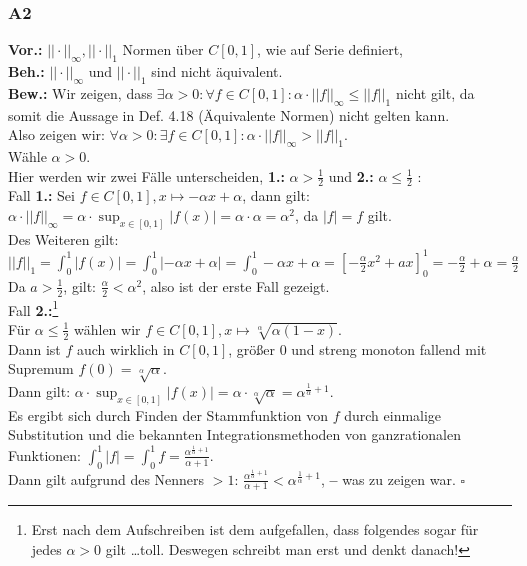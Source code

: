 \documentclass[12pt, a4paper]{article}
\newcommand*{\qed}{\null\nobreak\hfill\ensuremath{\square}}
\newcommand*{\gedanke}{\textbf{-- }}
\newcommand*{\gap}{\text{ }}
\newcommand*{\vor}{\textbf{Vor.:} \gap}
\newcommand*{\beh}{\textbf{Beh.:} \gap}
\newcommand*{\bew}{\textbf{Bew.:} \gap}
\begin{document}
\subsubsection*{A2}
\vor \(||\cdot||_\infty, ||\cdot||_1\) Normen über \(C[0,1]\), wie auf Serie definiert,\\
\beh \(||\cdot||_\infty \text{ und } ||\cdot||_1\) sind nicht äquivalent. \\
\bew Wir zeigen, dass \(\exists \alpha > 0: \forall f \in C[0,1]: \alpha \cdot ||f||_\infty \le ||f||_1\) nicht gilt, da somit die Aussage in Def. 4.18 (Äquivalente Normen) nicht gelten kann. \\
Also zeigen wir: \(\forall \alpha > 0: \exists f \in C[0,1]: \alpha \cdot ||f||_\infty > ||f||_1\). \\
Wähle \(\alpha > 0\).\\
Hier werden wir zwei Fälle unterscheiden, \textbf{1.:} \(\alpha > \frac{1}{2}\) und \textbf{2.:} \(\alpha \le \frac{1}{2}\) : \\
Fall \textbf{1.:} Sei \(f \in C[0,1], x \mapsto -\alpha x + \alpha\), dann gilt: \\
\(\alpha \cdot ||f||_\infty = \alpha \cdot \sup_{x\in [0,1]}|f(x)| = \alpha \cdot \alpha = \alpha^2\),  da \(|f| = f\) gilt. \\
Des Weiteren gilt: \(||f||_1 = \int_{0}^{1}|f(x)| = \int_{0}^{1}|-\alpha x + \alpha| = \int_{0}^{1}-\alpha x + \alpha = \left[-\frac{\alpha}{2}x^2+ ax\right]_0^1 = -\frac{\alpha}{2} + \alpha = \frac{\alpha}{2}\) \\
Da \(a > \frac{1}{2}\), gilt: \(\frac{\alpha}{2} < \alpha^2\), also ist der erste Fall gezeigt. \\
Fall \textbf{2.:}\footnote[1]{Erst nach dem Aufschreiben ist dem  aufgefallen, dass folgendes sogar für jedes \(\alpha > 0\) gilt \dots toll. Deswegen schreibt man erst und denkt danach!} \\
Für \(\alpha \le \frac{1}{2}\) wählen wir \(f \in C[0,1], x \mapsto \sqrt[\alpha]{\alpha(1-x)}\). \\
Dann ist \(f\) auch wirklich in \(C[0,1]\), größer 0 und streng monoton fallend mit Supremum \(f(0) = \sqrt[\alpha]{\alpha}\). \\
Dann gilt: \(\alpha \cdot \sup_{x \in [0,1]}|f(x)| = \alpha \cdot \sqrt[\alpha]{\alpha} = \alpha^{\frac{1}{\alpha} + 1}\). \\
Es ergibt sich durch Finden der Stammfunktion von \(f\) durch einmalige Substitution und die bekannten Integrationsmethoden von ganzrationalen Funktionen: \(\int_{0}^{1}|f| = \int_{0}^{1}f = \frac{\alpha^{\frac{1}{\alpha} + 1}}{\alpha + 1}\).\\
Dann gilt aufgrund des Nenners \(> 1\): \(\frac{\alpha^{\frac{1}{\alpha} + 1}}{\alpha + 1} < \alpha^ {\frac{1}{\alpha} + 1}\), \gedanke was zu zeigen war. \qed \pagebreak 
\end{document}
